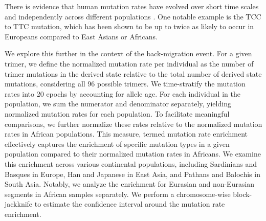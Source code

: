 There is evidence that human mutation rates have evolved over short time scales and independently across different populations \cite{harris2015evidence, harris2017rapid}. One notable example is the TCC to TTC mutation, which has been shown to be up to twice as likely to occur in Europeans compared to East Asians or Africans. 

We explore this further in the context of the back-migration event. For a given trimer, we define the normalized mutation rate per individual as the number of trimer mutations in the derived state relative to the total number of derived state mutations, considering all 96 possible trimers. We time-stratify the mutation rates into 20 epochs by accounting for allele age. For each individual in the population, we sum the numerator and denominator separately, yielding normalized mutation rates for each population. To facilitate meaningful comparisons, we further normalize these rates relative to the normalized mutation rates in African populations. This measure, termed mutation rate enrichment effectively captures the enrichment of specific mutation types in a given population compared to their normalized mutation rates in Africans. We examine this enrichment across various continental populations, including Sardinians and Basques in Europe, Han and Japanese in East Asia, and Pathans and Balochis in South Asia. Notably, we analyze the enrichment for Eurasian and non-Eurasian segments in African samples separately. We perform a chromosome-wise block-jackknife to estimate the confidence interval around the mutation rate enrichment. 

